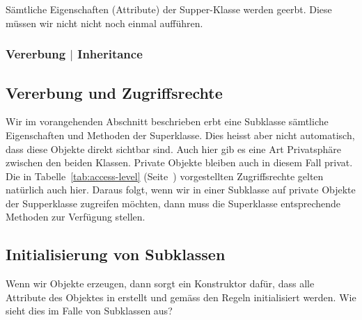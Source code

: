 Sämtliche Eigenschaften (Attribute) der Supper-Klasse werden geerbt. Diese müssen
wir nicht nicht noch einmal aufführen.


\begin{frame}[fragile]
    \frametitle<presentation>{Vererbung $|$ Inheritance}
\end{frame}



\subsection{Vererbung und Zugriffsrechte}
\label{subsec:inheritance-access}

Wir im vorangehenden Abschnitt beschrieben erbt eine Subklasse sämtliche Eigenschaften
und Methoden der Superklasse. Dies heisst aber nicht automatisch, dass diese Objekte
direkt sichtbar sind. Auch hier gib es eine Art Privatsphäre zwischen den beiden Klassen.
Private Objekte bleiben auch in diesem Fall privat. Die in Tabelle~\ref{tab:access-level}
(Seite~\pageref{tab:access-level}) vorgestellten Zugriffsrechte gelten natürlich auch hier.
Daraus folgt, wenn wir in einer Subklasse auf private Objekte der Supperklasse zugreifen
möchten, dann muss die Superklasse entsprechende Methoden zur Verfügung stellen.


\subsection{Initialisierung von Subklassen}
\label{subsec:init-subclasses}

Wenn wir Objekte erzeugen, dann sorgt ein Konstruktor dafür, dass alle Attribute des Objektes
in erstellt und gemäss den Regeln initialisiert werden. Wie sieht dies im Falle von Subklassen aus?

